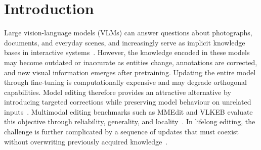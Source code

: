 \documentclass[letterpaper]{article} %
\begin{document}

\section{Introduction}

Large vision-language models (VLMs) can answer questions about photographs, documents, and everyday scenes, and increasingly serve as implicit knowledge bases in interactive systems~\citep{li2023blip2}. However, the knowledge encoded in these models may become outdated or inaccurate as entities change, annotations are corrected, and new visual information emerges after pretraining. Updating the entire model through fine-tuning is computationally expensive and may degrade orthogonal capabilities. Model editing therefore provides an attractive alternative by introducing targeted corrections while preserving model behaviour on unrelated inputs~\citep{Mitchell2021FastME,mitchell2022serac,cheng2023mmedit}. Multimodal editing benchmarks such as MMEdit and VLKEB evaluate this objective through reliability, generality, and locality~\citep{cheng2023mmedit,huang2024vlkeb}. In lifelong editing, the challenge is further complicated by a sequence of updates that must coexist without overwriting previously acquired knowledge~\citep{chen2025liveedit}.
\end{document}
